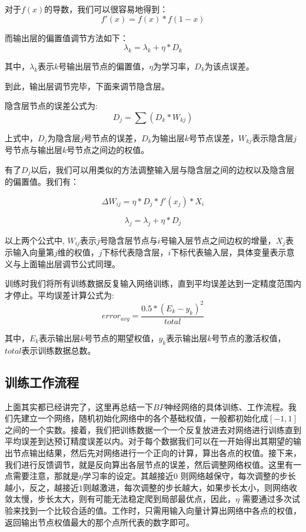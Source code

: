 ﻿\documentclass[UTF8]{ctexart}
\begin{document}
对于$f(x)$的导数，我们可以很容易地得到：
$$f'(x) = f(x) * f(1 - x)$$ \par
而输出层的偏置值调节方法如下：
$$\lambda _k = \lambda _k + \eta * D_k$$ \par
其中，$\lambda _k$表示$k$号输出层节点的偏置值，$\eta$为学习率，$D_k$为该点误差。\par
到此，输出层调节完毕，下面来调节隐含层。\par
隐含层节点的误差公式为:
$$D_j = \sum (D_k * W_{kj})$$ \par
上式中，$D_j$为隐含层$j$号节点的误差，$D_k$为输出层$k$号节点误差，$W_{kj}$表示隐含层$j$号节点与输出层$k$号节点之间边的权值。\par
有了$D_j$以后，我们可以用类似的方法调整输入层与隐含层之间的边权以及隐含层的偏置值。我们有：\par
$$\Delta W_{ij} = \eta * D_j * f'(x_j) * X_i$$ \par
$$\lambda _j = \lambda _j + \eta * D_j$$ \par
以上两个公式中, $W_{ij}$表示$j$号隐含层节点与$i$号输入层节点之间边权的增量，$X_j$表示输入向量第$j$维的权值，$j$下标代表隐含层，$i$下标代表输入层，具体变量表示意义与上面输出层调节公式同理。\par
训练时我们将所有训练数据反复输入网络训练，直到平均误差达到一定精度范围内才停止。平均误差计算公式为:
$$error _{avg} = \frac{0.5 * (E_k - y_k)^2}{total}$$ \par
其中，$E_k$表示输出层$k$号节点的期望权值，$y_k$表示输出层$k$号节点的激活权值，$total$表示训练数据总数。 \par
    \subsection{训练工作流程}
上面其实都已经讲完了，这里再总结一下$BP$神经网络的具体训练、工作流程。我们先建立一个网络，随机初始化网络中的各个基础权值，一般都初始化成$[-1,1]$之间的一个实数。接着，我们把训练数据一个一个反复放进去对网络进行训练直到平均误差到达预订精度误差以内。对于每个数据我们可以在一开始得出其期望的输出节点输出结果，然后先对网络进行一个正向的计算，算出各点的权值。接下来，我们进行反馈调节，就是反向算出各层节点的误差，然后调整网络权值。这里有一点需要注意，那就是$\eta$学习率的设定。其越接近$0$ 则网络越保守，每次调整的步长越小，反之，越接近$1$则越激进，每次调整的步长越大，如果步长太小，则网络收敛太慢，步长太大，则有可能无法稳定爬到局部最优点，因此，$\eta$ 需要通过多次试验来找到一个比较合适的值。工作时，只需用输入向量计算出网络中各点的权值，返回输出节点权值最大的那个点所代表的数字即可。
\end{document}

